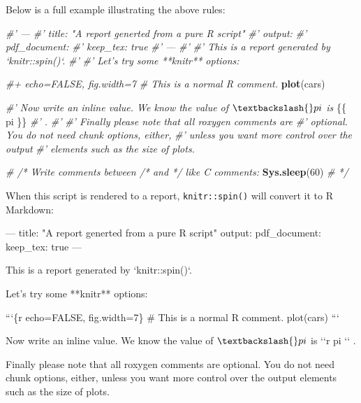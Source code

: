 \documentclass[
  11pt,
]{krantz}
\newenvironment{Shaded}{\begin{snugshade}}{\end{snugshade}}
\newcommand{\BaseNTok}[1]{\textcolor[rgb]{0.06,0.06,0.06}{#1}}
\newcommand{\CommentTok}[1]{\textcolor[rgb]{0.37,0.37,0.37}{\textit{#1}}}
\newcommand{\DecValTok}[1]{\textcolor[rgb]{0.06,0.06,0.06}{#1}}
\newcommand{\KeywordTok}[1]{\textcolor[rgb]{0.27,0.27,0.27}{\textbf{#1}}}
\newcommand{\NormalTok}[1]{#1}
\begin{document}
Below is a full example illustrating the above rules:

\begin{Shaded}
\begin{Highlighting}[]
\CommentTok{#' ---}
\CommentTok{#' title: "A report generted from a pure R script"}
\CommentTok{#' output:}
\CommentTok{#'   pdf_document:}
\CommentTok{#'     keep_tex: true}
\CommentTok{#' ---}
\CommentTok{#'}
\CommentTok{#' This is a report generated by `knitr::spin()`.}
\CommentTok{#'}
\CommentTok{#' Let's try some **knitr** options:}

\CommentTok{#+ echo=FALSE, fig.width=7}
\CommentTok{#  This is a normal R comment.}
\KeywordTok{plot}\NormalTok{(cars)}

\CommentTok{#' Now write an inline value. We know the value of $\textbackslash{}pi$ is}
\NormalTok{\{\{ pi \}\}}
\CommentTok{#' .}
\CommentTok{#'}
\CommentTok{#' Finally please note that all roxygen comments are}
\CommentTok{#' optional. You do not need chunk options, either,}
\CommentTok{#' unless you want more control over the output}
\CommentTok{#' elements such as the size of plots.}

\CommentTok{# /* Write comments between /* and */ like C comments:}
\KeywordTok{Sys.sleep}\NormalTok{(}\DecValTok{60}\NormalTok{)}
\CommentTok{# */}
\end{Highlighting}
\end{Shaded}

When this script is rendered to a report, \texttt{knitr::spin()} will convert it to R Markdown:

\begin{Shaded}
\begin{Highlighting}[]
\NormalTok{---}
\NormalTok{title: "A report generted from a pure R script"}
\NormalTok{output:}
\NormalTok{  pdf_document:}
\BaseNTok{    keep_tex: true}
\NormalTok{---}

\NormalTok{This is a report generated by }\BaseNTok{`knitr::spin()`}\NormalTok{.}

\NormalTok{Let's try some **knitr** options:}

\BaseNTok{```\{r echo=FALSE, fig.width=7\}}
\BaseNTok{#  This is a normal R comment.}
\BaseNTok{plot(cars)}
\BaseNTok{```}

\NormalTok{Now write an inline value. We know the value of $\textbackslash{}pi$ is}
\NormalTok{`}\BaseNTok{`r  pi  `}\NormalTok{`}
\NormalTok{.}

\NormalTok{Finally please note that all roxygen comments are}
\NormalTok{optional. You do not need chunk options, either,}
\NormalTok{unless you want more control over the output}
\NormalTok{elements such as the size of plots.}
\end{Highlighting}
\end{Shaded}
\end{document}
